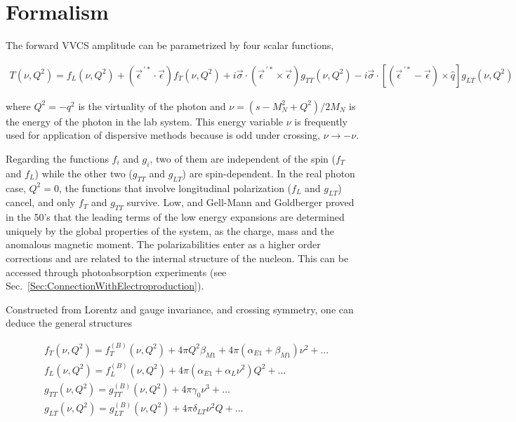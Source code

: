 \documentclass[prc,twocolumn,showpacs,preprintnumbers,amsmath,amssymb
,superscriptaddress,a4paper,nofootinbib
]{revtex4-1}
\begin{document}
\section{Formalism} 
\label{Sec:Formalism}

The forward VVCS amplitude can be parametrized by four 
scalar functions,
\begin{widetext}
\begin{align}\label{Eq:T-Compt-definition}
T(\nu,Q^2)=f_{L}(\nu,Q^2) +(\vec{\epsilon}^{\, \prime *} \cdot \vec{\epsilon}) f_{T}(\nu,Q^2)  +  i \vec{\sigma}\cdot (\vec{\epsilon}^{\, \prime *} \times \vec{\epsilon}) g_{TT}(\nu,Q^2) -  i \vec{\sigma}\cdot [(\vec{\epsilon}^{\, \prime *} - \vec{\epsilon})\times \hat{q}] g_{LT}(\nu,Q^2) 
\end{align}
\end{widetext}

where $Q^2=-q^2$ is the virtuality of the photon and $\nu=(s-M_N^2+Q^2)/2M_N$ is the energy of the photon in the lab system.
This energy variable $\nu$ is frequently used for application of dispersive methods because is odd under crossing, $\nu \to -\nu$.

Regarding the functions $f_i$ and $g_i$, two of them are independent of the spin ($f_T$ and $f_L$) while the other two ($g_{TT}$ and $g_{LT}$) are spin-dependent. 
In the real photon case, $Q^2=0$, the functions that involve longitudinal polarization ($f_L$ and $g_{LT}$) cancel, and only $f_T$ and $g_{TT}$ survive. 
Low, and Gell-Mann and Goldberger \cite{LET} proved in the 50's that the leading terms of the low energy expansions are determined uniquely by the global properties of the system, as the charge, mass and the anomalous magnetic moment. 
The polarizabilities enter as a higher order corrections and are related to the internal structure of the nucleon. 
This can be accessed through photoabsorption experiments (see Sec.~\ref{Sec:ConnectionWithElectroproduction}).

Constructed from Lorentz and gauge invariance, and crossing symmetry, one can deduce the general structures 

\begin{align}
 & f_T(\nu, Q^2)= f_T^{(B)}(\nu, Q^2) + 4 \pi Q^2 \beta_{M1} + 4 \pi(\alpha_{E1} + \beta_{M1}) \nu^2 + \dots \label{Eq:LEX-fT}\\
 & f_L(\nu, Q^2)= f_L^{(B)}(\nu, Q^2) + 4 \pi(\alpha_{E1}+\alpha_{L} \nu^2) Q^2 + \dots \label{Eq:LEX-fL}\\
 & g_{TT}(\nu, Q^2)=g^{(B)}_{TT}(\nu, Q^2) + 4 \pi\gamma_0  \nu^3 + \dots \label{Eq:LEX-gTT}\\
 & g_{LT}(\nu, Q^2)=g^{(B)}_{LT}(\nu, Q^2) +  4 \pi\delta_{LT} \nu^2 Q + \dots \label{Eq:LEX-gLT}
\end{align}
\end{document}
